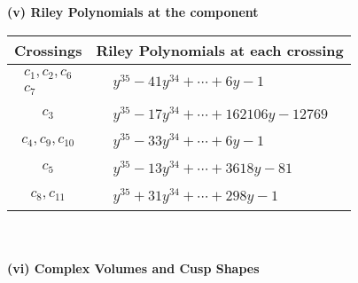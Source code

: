 \documentclass[1p]{elsarticle_modified}
\theoremstyle{definition}
\begin{document}
\newpage\renewcommand{\arraystretch}{1}
\flushleft \textbf{(v) Riley Polynomials at the component}\newline \\
\begin{tabular}{m{50pt}|m{274pt}}
Crossings & \hspace{64pt}Riley Polynomials at each crossing \\
\hline $$\begin{aligned}c_{1},c_{2},c_{6}\\c_{7}\end{aligned}$$&$\begin{aligned}
&y^{35}-41 y^{34}+\cdots+6 y-1
\end{aligned}$\\
\hline $$\begin{aligned}c_{3}\end{aligned}$$&$\begin{aligned}
&y^{35}-17 y^{34}+\cdots+162106 y-12769
\end{aligned}$\\
\hline $$\begin{aligned}c_{4},c_{9},c_{10}\end{aligned}$$&$\begin{aligned}
&y^{35}-33 y^{34}+\cdots+6 y-1
\end{aligned}$\\
\hline $$\begin{aligned}c_{5}\end{aligned}$$&$\begin{aligned}
&y^{35}-13 y^{34}+\cdots+3618 y-81
\end{aligned}$\\
\hline $$\begin{aligned}c_{8},c_{11}\end{aligned}$$&$\begin{aligned}
&y^{35}+31 y^{34}+\cdots+298 y-1
\end{aligned}$\\
\hline
\end{tabular}\\~\\
\newpage\flushleft \textbf{(vi) Complex Volumes and Cusp Shapes}
\end{document}
